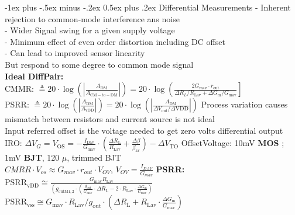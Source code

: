 \documentclass[5pt]{article}
\makeatletter
\renewcommand{\section}{\@startsection{section}{1}{0mm}%
                                {-1ex plus -.5ex minus -.2ex}%
                                {0.5ex plus .2ex}%
                                {\normalfont\large\bfseries}}
\makeatother
\begin{document}
\begin{multicols*}{4}
\section{Differential Measurements}
- Inherent rejection to common-mode interference ans noise\\
- Wider Signal swing for a given supply voltage\\
- Minimum effect of even order distortion including DC offset\\
- Can lead to improved sensor linearity \\
But respond to some degree to common mode signal\\
\textbf{Ideal DiffPair:}\\
CMMR: $  \triangleq 20 \cdot \log \left(\left|\frac{A_{\mathrm{DM}}}{A_{\mathrm{CM}-\mathrm{to}-\mathrm{DM}}}\right|\right) =20 \cdot \log \left(\frac{2 G_{\operatorname{mav}} \cdot r_{\mathrm{out}}}{\Delta R_{L} / R_{\mathrm{Lav}}+\Delta G_{\mathrm{m}} / G_{\mathrm{mav}}}\right] $\\
PSRR: $ \triangleq 20 \cdot \log \left(\left|\frac{A_{\mathrm{DM}}}{A_{\mathrm{vDD}}}\right|\right)=20 \cdot \log \left(\left|\frac{A_{\mathrm{DM}}}{\Delta V_{\mathrm{out}} / \Delta \mathrm{VDD}}\right|\right) $
Process variation causes mismatch between resistors and current source is not ideal\\
Input referred offset is the voltage needed to get zero volts differential output\\
IRO: $ \Delta V_{G}=V_{\mathrm{OS}}=-\frac{I_{\mathrm{Dav}}}{G_{\mathrm{mav}}} \cdot\left(\frac{\Delta R_{\mathrm{L}}}{R_{\mathrm{Lav}}}+\frac{\Delta \beta}{\beta_{\mathrm{av}}}\right)-\Delta V_{\mathrm{TO}} $
OffsetVoltage: 10mV \textbf{MOS} ; 1mV \textbf{BJT}, 120 $ \mu  $, trimmed BJT\\
$ CMRR \cdot V_{os} \approx G_{mav} \cdot r_{out} \cdot V_{OV} $, $ V_{OV} = \frac{I_{DAV}}{G_{mav}} $
\textbf{PSRR:}\\
$ \mathrm{PSRR}_{\mathrm{vDD}} \cong \frac{G_{\operatorname{mav}} R_{\mathrm{Lav}} }{  \left(g_{\mathrm{outM} 1,2} \cdot\left(\frac{g_{\mathrm{out}}}{G_{\mathrm{mav}}} \cdot \Delta R_{\mathrm{L}}-2 \cdot R_{\mathrm{Lav}} \cdot \frac{\Delta G_{\mathrm{m}}}{G_{\mathrm{mav}}}\right)\right.} $\\
$ \mathrm{PSRR}_{\mathrm{vss}} \cong G_{\operatorname{mav}} \cdot R_{\mathrm{Lav}} / g_{\mathrm{out}} \cdot\left(\Delta R_{\mathrm{L}}+R_{\mathrm{Lav}} \cdot \frac{\Delta G_{\mathrm{m}}}{G_{\mathrm{mav}}}\right) $

\end{multicols*}
\end{document}
